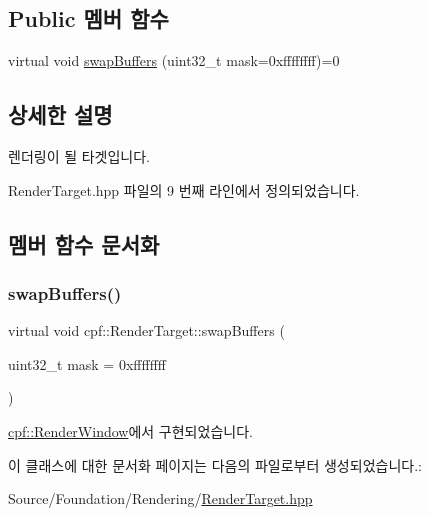 \subsection*{Public 멤버 함수}
\begin{DoxyCompactItemize}
\item 
virtual void \hyperlink{classcpf_1_1_render_target_aaa9d8d7751c1cc33fbe896600ba0e459}{swap\+Buffers} (uint32\+\_\+t mask=0xffffffff)=0
\end{DoxyCompactItemize}


\subsection{상세한 설명}
렌더링이 될 타겟입니다. 

Render\+Target.\+hpp 파일의 9 번째 라인에서 정의되었습니다.



\subsection{멤버 함수 문서화}
\mbox{\label{classcpf_1_1_render_target_aaa9d8d7751c1cc33fbe896600ba0e459}} 
\subsubsection{\texorpdfstring{swap\+Buffers()}{swapBuffers()}}
{\footnotesize\ttfamily virtual void cpf\+::\+Render\+Target\+::swap\+Buffers (\begin{DoxyParamCaption}\item[{uint32\+\_\+t}]{mask = {\ttfamily 0xffffffff} }\end{DoxyParamCaption})\hspace{0.3cm}{\ttfamily [pure virtual]}}



\hyperlink{classcpf_1_1_render_window_aebc9f2d43f5802a2affb26a2179312c9}{cpf\+::\+Render\+Window}에서 구현되었습니다.



이 클래스에 대한 문서화 페이지는 다음의 파일로부터 생성되었습니다.\+:\begin{DoxyCompactItemize}
\item 
Source/\+Foundation/\+Rendering/\hyperlink{_render_target_8hpp}{Render\+Target.\+hpp}\end{DoxyCompactItemize}
